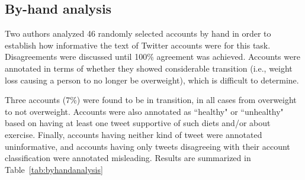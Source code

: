 \subsection{By-hand analysis}

Two authors analyzed 46 randomly selected accounts by hand in order to establish how informative the text of Twitter accounts were for this task. Disagreements were discussed until 100\% agreement was achieved. Accounts were annotated in terms of whether they showed considerable transition (i.e., weight loss causing a person to no longer be overweight), 
which is difficult to determine.

Three accounts (7\%) were found to be in transition, in all cases from overweight to not overweight. Accounts were also annotated as 
``healthy" or ``unhealthy" based on having at least one tweet supportive of such diets and/or about exercise. 
Finally, accounts having neither kind of tweet were annotated uninformative, and accounts having only tweets disagreeing with their account classification were annotated misleading. Results are summarized in Table~\ref{tab:byhandanalysis}

